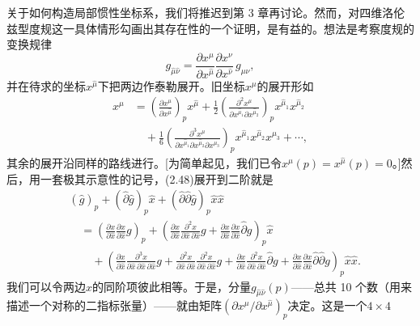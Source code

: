 关于如何构造局部惯性坐标系，我们将推迟到第 3 章再讨论。然而，对四维洛伦兹型度规这一具体情形勾画出其存在性的一个证明，是有益的。想法是考察度规的变换规律
\begin{equation*}
g_{\hat\mu\hat\nu}=\frac{\partial x^\mu}{\partial x^{\hat\mu}}\frac{\partial x^\nu}{\partial x^{\hat\nu}}\,g_{\mu\nu},
\tag{2.48}
\end{equation*}
并在待求的坐标$x^{\hat\mu}$下把两边作泰勒展开。旧坐标$x^\mu$的展开形如
\begin{align*}
x^\mu&=\left(\frac{\partial x^\mu}{\partial x^{\hat\mu}}\right)_p x^{\hat\mu}
+\frac{1}{2}\left(\frac{\partial^2 x^\mu}{\partial x^{\hat\mu_1}\partial x^{\hat\mu_2}}\right)_p x^{\hat\mu_1}x^{\hat\mu_2}\\
&\quad+\frac{1}{6}\left(\frac{\partial^3 x^\mu}{\partial x^{\hat\mu_1}\partial x^{\hat\mu_2}\partial x^{\hat\mu_3}}\right)_p x^{\hat\mu_1}x^{\hat\mu_2}x^{\hat\mu_3}+\cdots,
\tag{2.49}
\end{align*}
其余的展开沿同样的路线进行。[为简单起见，我们已令$x^\mu(p)=x^{\hat\mu}(p)=0$。]然后，用一套极其示意性的记号，(2.48)展开到二阶就是
\begin{align*}
&(\hat g)_p+\left(\hat\partial\hat g\right)_p\hat x+\left(\hat\partial\hat\partial\hat g\right)_p\hat x\hat x\\
&\quad=\left(\frac{\partial x}{\partial \hat x}\frac{\partial x}{\partial \hat x}g\right)_p
+\left(\frac{\partial x}{\partial \hat x}\frac{\partial^2 x}{\partial \hat x\,\partial \hat x}g+\frac{\partial x}{\partial \hat x}\frac{\partial x}{\partial \hat x}\hat\partial g\right)_p\hat x\\
&\quad\quad+\left(\frac{\partial x}{\partial \hat x}\frac{\partial^3 x}{\partial \hat x\,\partial \hat x\,\partial \hat x}g+\frac{\partial^2 x}{\partial \hat x\,\partial \hat x}\frac{\partial^2 x}{\partial \hat x\,\partial \hat x}g+\frac{\partial x}{\partial \hat x}\frac{\partial^2 x}{\partial \hat x\,\partial \hat x}\hat\partial g+\frac{\partial x}{\partial \hat x}\frac{\partial x}{\partial \hat x}\hat\partial\hat\partial g\right)_p\hat x\hat x.
\tag{2.50}
\end{align*}
我们可以令两边$\hat x$的同阶项彼此相等。于是，分量$g_{\hat\mu\hat\nu}(p)$——总共 10 个数（用来描述一个对称的二指标张量）——就由矩阵$\left(\partial x^\mu/\partial x^{\hat\mu}\right)_p$决定。这是一个$4\times4$
